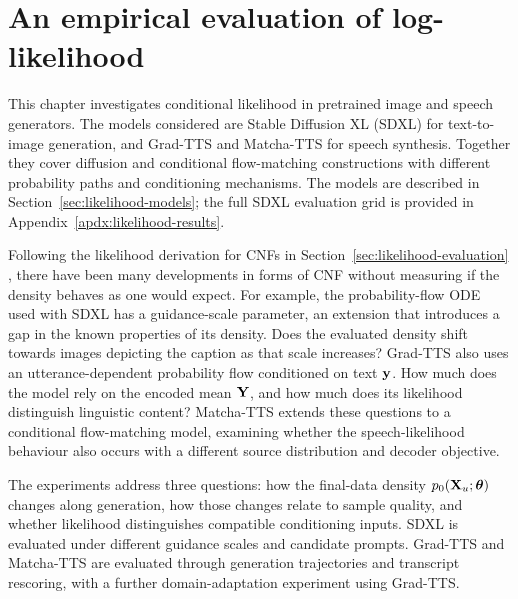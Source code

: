 \chapter{An empirical evaluation of log-likelihood}
\label{ch:ll}



This chapter investigates conditional likelihood in pretrained image and speech generators. The models considered are Stable Diffusion XL (SDXL) for text-to-image generation, and Grad-TTS and Matcha-TTS for speech synthesis. Together they cover diffusion and conditional flow-matching constructions with different probability paths and conditioning mechanisms. The models are described in Section~\ref{sec:likelihood-models}; the full SDXL evaluation grid is provided in Appendix~\ref{apdx:likelihood-results}.

Following the likelihood derivation for \acp{CNF} in Section~\ref{sec:likelihood-evaluation} \citep{NEURIPS2018_69386f6b}, there have been many developments in forms of \ac{CNF} without measuring if the density behaves as one would expect. For example, the probability-flow \ac{ODE} used with SDXL has a guidance-scale parameter, an extension that introduces a gap in the known properties of its density. Does the evaluated density shift towards images depicting the caption as that scale increases? Grad-TTS also uses an utterance-dependent probability flow conditioned on text ${\mathbf{y}}$. How much does the model rely on the encoded mean ${\mathbf{Y}}$, and how much does its likelihood distinguish linguistic content? Matcha-TTS extends these questions to a conditional flow-matching model, examining whether the speech-likelihood behaviour also occurs with a different source distribution and decoder objective.

The experiments address three questions: how the final-data density $p_0({\mathbf{X}}_u;{\bm{\theta}})$ changes along generation, how those changes relate to sample quality, and whether likelihood distinguishes compatible conditioning inputs. SDXL is evaluated under different guidance scales and candidate prompts. Grad-TTS and Matcha-TTS are evaluated through generation trajectories and transcript rescoring, with a further domain-adaptation experiment using Grad-TTS.

